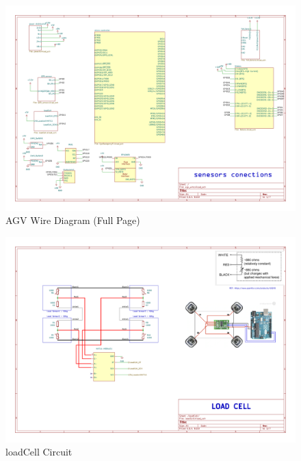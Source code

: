 \documentclass[../../main]{subfiles}
\begin{document}
\begin{figure} %
    \centering
    \includegraphics[width=0.98\textheight,angle=90]{fig/agv_wire.pdf}
    \caption{AGV Wire Diagram (Full Page)}
\end{figure}

\newpage

\begin{figure}[p] %
    \centering
    \includegraphics[width=0.98\textheight,angle=90]{fig/agv_wire-loadCell.pdf}
    \caption{loadCell Circuit}
\end{figure}

\newpage
\end{document}

